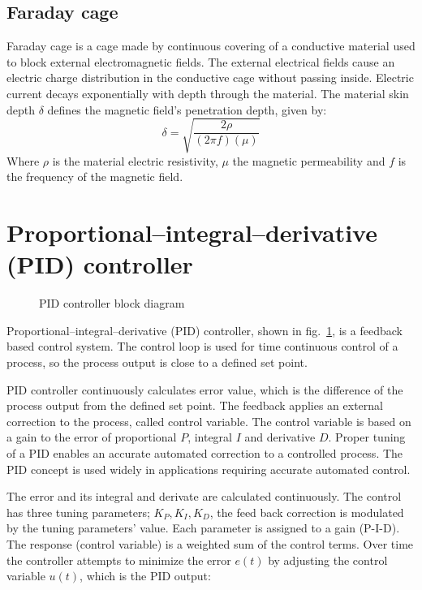 \documentclass[\main/master.tex]{subfiles}
\begin{document}
\subsection{Faraday cage}
\par\noindent
Faraday cage is a cage made by continuous covering of a conductive material used to block external electromagnetic fields. The external electrical fields cause an electric charge distribution in the conductive cage without passing inside. Electric current decays exponentially with depth through the material. The material skin depth $\delta$ defines the magnetic field's penetration depth, given by:
\begin{equation}
\delta = \sqrt{\frac{2\rho}{(2\pi f)(\mu)} }    \label{eqn:skin depth}
\end{equation}
Where $\rho$ is the material electric resistivity, $\mu$ the magnetic permeability and $f$ is the frequency of the magnetic field.


\section{Proportional–integral–derivative (PID) controller}
\begin{figure}[htbp]
	\centering
	\caption[PID controller block diagram]{PID controller block diagram}
	\label{fig:PID_scheme}
\end{figure}
\FloatBarrier
\par\noindent
Proportional–integral–derivative (PID) controller, shown in fig.~\ref{fig:PID_scheme}, is a feedback based control system. The control loop is used for time continuous control of a process, so the process output is close to a defined set point.
\par\noindent
PID controller continuously calculates error value, which is the difference of the process output from the defined set point. The feedback applies an external correction to the process, called control variable. The control variable is based on a gain to the error of proportional $P$, integral $I$ and derivative $D$. Proper tuning of a PID enables an accurate automated correction to a controlled process. The PID concept is used widely in applications requiring accurate automated control.

\par\noindent
The error and its integral and derivate are calculated continuously. The control has three tuning parameters; $K_P, K_I, K_D$, the feed back correction is modulated by the tuning parameters' value. Each parameter is assigned to a gain (P-I-D). The response (control variable) is a weighted sum of the control terms. Over time the controller attempts to minimize the error $e(t)$ by adjusting the control variable $u(t)$, which is the PID output:
\par\noindent
\end{document}
